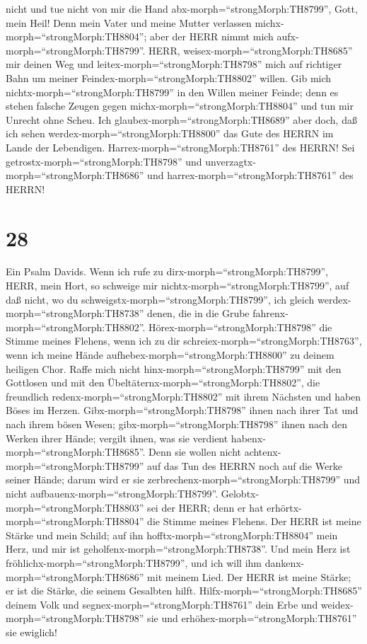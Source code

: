 nicht und tue nicht von mir die Hand abx-morph=``strongMorph:TH8799'',
Gott, mein Heil!  Denn mein Vater und meine Mutter
verlassen michx-morph=``strongMorph:TH8804''; aber der HERR nimmt mich
aufx-morph=``strongMorph:TH8799''.  HERR,
weisex-morph=``strongMorph:TH8685'' mir deinen Weg und
leitex-morph=``strongMorph:TH8798'' mich auf richtiger Bahn um meiner
Feindex-morph=``strongMorph:TH8802'' willen.  Gib mich
nichtx-morph=``strongMorph:TH8799'' in den Willen meiner Feinde; denn es
stehen falsche Zeugen gegen michx-morph=``strongMorph:TH8804'' und tun
mir Unrecht ohne Scheu.  Ich
glaubex-morph=``strongMorph:TH8689'' aber doch, daß ich sehen
werdex-morph=``strongMorph:TH8800'' das Gute des HERRN im Lande der
Lebendigen.  Harrex-morph=``strongMorph:TH8761'' des HERRN!
Sei getrostx-morph=``strongMorph:TH8798'' und
unverzagtx-morph=``strongMorph:TH8686'' und
harrex-morph=``strongMorph:TH8761'' des HERRN!

\hypertarget{section-27}{%
\section{28}\label{section-27}}

 Ein Psalm Davids. Wenn ich rufe zu
dirx-morph=``strongMorph:TH8799'', HERR, mein Hort, so schweige mir
nichtx-morph=``strongMorph:TH8799'', auf daß nicht, wo du
schweigstx-morph=``strongMorph:TH8799'', ich gleich
werdex-morph=``strongMorph:TH8738'' denen, die in die Grube
fahrenx-morph=``strongMorph:TH8802''. 
Hörex-morph=``strongMorph:TH8798'' die Stimme meines Flehens, wenn ich
zu dir schreiex-morph=``strongMorph:TH8763'', wenn ich meine Hände
aufhebex-morph=``strongMorph:TH8800'' zu deinem heiligen Chor.
 Raffe mich nicht hinx-morph=``strongMorph:TH8799'' mit den
Gottlosen und mit den Übeltäternx-morph=``strongMorph:TH8802'', die
freundlich redenx-morph=``strongMorph:TH8802'' mit ihrem Nächsten und
haben Böses im Herzen.  Gibx-morph=``strongMorph:TH8798''
ihnen nach ihrer Tat und nach ihrem bösen Wesen;
gibx-morph=``strongMorph:TH8798'' ihnen nach den Werken ihrer Hände;
vergilt ihnen, was sie verdient habenx-morph=``strongMorph:TH8685''.
 Denn sie wollen nicht achtenx-morph=``strongMorph:TH8799''
auf das Tun des HERRN noch auf die Werke seiner Hände; darum wird er sie
zerbrechenx-morph=``strongMorph:TH8799'' und nicht
aufbauenx-morph=``strongMorph:TH8799''. 
Gelobtx-morph=``strongMorph:TH8803'' sei der HERR; denn er hat
erhörtx-morph=``strongMorph:TH8804'' die Stimme meines Flehens.
 Der HERR ist meine Stärke und mein Schild; auf ihn
hofftx-morph=``strongMorph:TH8804'' mein Herz, und mir ist
geholfenx-morph=``strongMorph:TH8738''. Und mein Herz ist
fröhlichx-morph=``strongMorph:TH8799'', und ich will ihm
dankenx-morph=``strongMorph:TH8686'' mit meinem Lied.  Der
HERR ist meine Stärke; er ist die Stärke, die seinem Gesalbten hilft.
 Hilfx-morph=``strongMorph:TH8685'' deinem Volk und
segnex-morph=``strongMorph:TH8761'' dein Erbe und
weidex-morph=``strongMorph:TH8798'' sie und
erhöhex-morph=``strongMorph:TH8761'' sie ewiglich!

